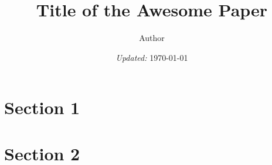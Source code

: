 \documentclass[11pt]{article}
\title{ Title of the Awesome Paper}
\author{ Author }
\date{\textit{Updated:} \today}
\begin{document}
	\maketitle	
	\pagebreak
	
	
	
	\section{Section 1}
	
	
	\section{Section 2}
	
	
	\appendix
	
	
\end{document}
